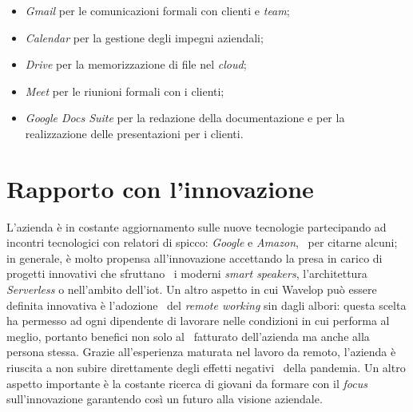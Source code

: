 \begin{itemize}
  \item \emph{Gmail} per le comunicazioni formali con clienti e \emph{team};
  \item \emph{Calendar} per la gestione degli impegni aziendali;
  \item \emph{Drive} per la memorizzazione di file nel \emph{cloud};
  \item \emph{Meet} per le riunioni formali con i clienti;
  \item \emph{Google Docs Suite} per la redazione della documentazione e per la realizzazione delle presentazioni per i clienti.
\end{itemize}

\section{Rapporto con l'innovazione}
L'azienda è in costante aggiornamento sulle nuove tecnologie partecipando ad incontri tecnologici con relatori di spicco: \emph{Google} e \emph{Amazon}, \
per citarne alcuni; in generale, è molto propensa all'innovazione accettando la presa in carico di progetti innovativi che sfruttano \
i moderni \emph{smart speakers}, l'architettura \emph{Serverless} o nell'ambito dell'\acrfull{iot}. Un altro aspetto in cui Wavelop può essere definita innovativa è l'adozione \
del \emph{remote working} sin dagli albori: questa scelta ha permesso ad ogni dipendente di lavorare nelle condizioni in cui performa al meglio, portanto benefici non solo al \
fatturato dell'azienda ma anche alla persona stessa. Grazie all'esperienza maturata nel lavoro da remoto, l'azienda è riuscita a non subire direttamente degli effetti negativi \
della pandemia. Un altro aspetto importante è la costante ricerca di giovani da formare con il \emph{focus} sull'innovazione garantendo così un futuro alla visione aziendale.